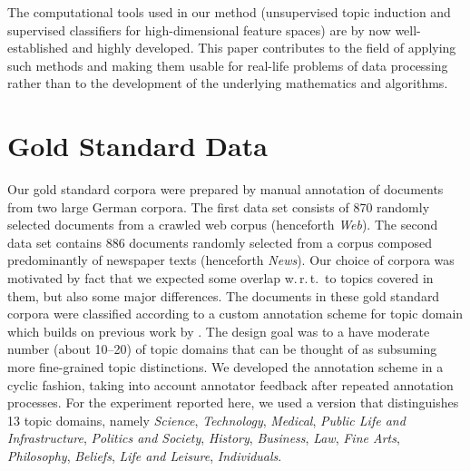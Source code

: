 \documentclass[11pt]{article}
\begin{document}
The computational tools used in our method (unsupervised topic induction and supervised classifiers for high-dimensional feature spaces) are by now well-established and highly developed.
This paper contributes to the field of applying such methods and making them usable for real-life problems of data processing rather than to the development of the underlying mathematics and algorithms.

\section{Gold Standard Data}
\label{sec:goldstandard}

Our gold standard corpora were prepared by manual annotation of documents from two large German corpora.
The first data set consists of 870 randomly selected documents from a crawled web corpus (henceforth \textit{Web}).
The second data set contains 886 documents randomly selected from a corpus composed predominantly of newspaper texts (henceforth \textit{News}).
Our choice of corpora was motivated by fact that we expected some overlap w.\,r.\,t.\ to topics covered in them, but also some major differences. 
The documents in these gold standard corpora were classified according to a custom annotation scheme for topic domain which builds on previous work by .
The design goal was to a have moderate number (about 10--20) of topic domains that can be thought of as subsuming more fine-grained topic distinctions.
We developed the annotation scheme in a cyclic fashion, taking into account annotator feedback after repeated annotation processes.
For the experiment reported here, we used a version that distinguishes 13 topic domains, namely \textit{Science}, \textit{Technology}, \textit{Medical}, \textit{Public Life and Infrastructure}, \textit{Politics and Society}, \textit{History}, \textit{Business}, \textit{Law}, \textit{Fine Arts},  \textit{Philosophy}, \textit{Beliefs},  \textit{Life and Leisure}, \textit{Individuals}.
\end{document}
